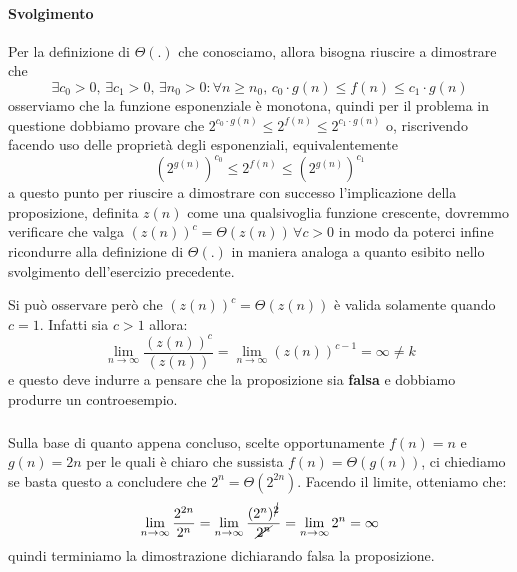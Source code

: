 \documentclass[11pt,a4paper,oneside]{article}
\begin{document}
\paragraph*{Svolgimento} Per la definizione di $\Theta(.)$ che conosciamo, allora bisogna riuscire a dimostrare che $$\exists c_0 > 0,\,\exists c_1 > 0,\,\exists n_0 > 0:\forall n \geq n_0,\,c_0 \cdot g(n) \leq f(n) \leq c_1 \cdot g(n)$$ osserviamo che la funzione esponenziale è monotona, quindi per il problema in questione dobbiamo provare che $2^{c_0 \cdot g(n)} \leq 2^{f(n)} \leq 2^{c_1 \cdot g(n)}$ o, riscrivendo facendo uso delle proprietà degli esponenziali, equivalentemente $$\left(2^{g(n)}\right)^{c_0} \leq 2^{f(n)} \leq \left(2^{g(n)}\right)^{c_1}$$
a questo punto per riuscire a dimostrare con successo l'implicazione della proposizione, definita $z(n)$ come una qualsivoglia funzione crescente, dovremmo verificare che valga \linebreak $(z(n))^c = \Theta(z(n))\,\forall c > 0$ in modo da poterci infine ricondurre alla definizione di $\Theta(.)$ in maniera analoga a quanto esibito nello svolgimento dell'esercizio precedente.\\
\begin{tcolorbox}[title=Osservazione]
Si può osservare però che $(z(n))^c = \Theta(z(n))$ è valida solamente quando $c = 1$. Infatti sia $c > 1$ allora: $$\lim_{n \to \infty} \frac{(z(n))^c}{(z(n))} = \lim_{n \to \infty} (z(n))^{c-1} = \infty \neq k$$ e questo deve indurre a pensare che la proposizione sia \textbf{falsa} e dobbiamo produrre un controesempio.
\end{tcolorbox}
\subparagraph*{} Sulla base di quanto appena concluso, scelte opportunamente $f(n) = n$ e $g(n) = 2n$ per le quali è chiaro che sussista $f(n) = \Theta(g(n))$, ci chiediamo se basta questo a concludere che $2^n = \Theta(2^{2n})$. Facendo il limite, otteniamo che: $$\lim_{n \to \infty} \frac{2^{2n}}{2^n} = \lim_{n \to \infty} \frac{(2^n)^{\cancel{2}}}{\cancel{2^n}} = \lim_{n \to \infty} 2^n = \infty$$ quindi terminiamo la dimostrazione dichiarando falsa la proposizione.
\end{document}
